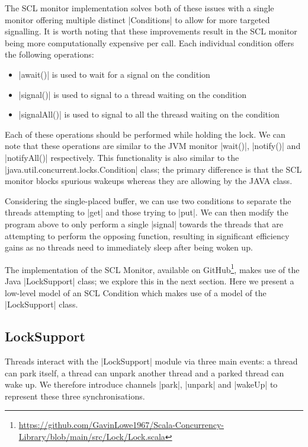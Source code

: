 The SCL monitor implementation solves both of these issues with a single monitor offering multiple distinct |Conditions| to allow for more targeted signalling. It is worth noting that these improvements result in the SCL monitor being more computationally expensive per call. Each individual condition offers the following operations:
\begin{itemize}
  \item |await()| is used to wait for a signal on the condition
  \item |signal()| is used to signal to a thread waiting on the condition
  \item |signalAll()| is used to signal to all the threasd waiting on the condition
\end{itemize}
Each of these operations should be performed while holding the lock. We can note that these operations are similar to the JVM monitor |wait()|, |notify()| and |notifyAll()| respectively. This functionality is also similar to the |java.util.concurrent.locks.Condition| class; the primary difference is that the SCL monitor blocks spurious wakeups whereas they are allowing by the JAVA class.

Considering the single-placed buffer, we can use two conditions to separate the threads attempting to |get| and those trying to |put|. We can then modify the program above to only perform a single |signal| towards the threads that are attempting to perform the opposing function, resulting in significant efficiency gains as no threads need to immediately sleep after being woken up.

The implementation of the SCL Monitor, available on GitHub\footnote{\url{https://github.com/GavinLowe1967/Scala-Concurrency-Library/blob/main/src/Lock/Lock.scala}}, makes use of the Java |LockSupport| class; we explore this in the next section. Here we present a low-level model of an SCL Condition which makes use of a model of the |LockSupport| class.

\subsection{LockSupport}

Threads interact with the |LockSupport| module via three main events: a thread can park itself, a thread can unpark another thread and a parked thread can wake up. We therefore introduce channels |park|, |unpark| and |wakeUp| to represent these three synchronisations. 

